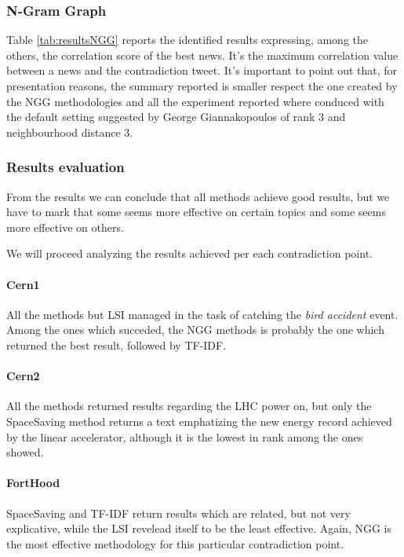 \subsubsection*{N-Gram Graph}
Table \ref{tab:resultsNGG} reports the identified results expressing, among the others, the correlation score of the best news. It's the maximum correlation value between a news and the contradiction tweet.
It's important to point out that, for presentation reasons, the summary reported is smaller respect the one created by the NGG methodologies and all the experiment reported where conduced with the default setting suggested by George Giannakopoulos of rank 3 and neighbourhood distance 3.









\subsubsection*{Results evaluation}
From the results we can conclude that all methods achieve good results,
but we have to mark that some seems more effective on certain topics and some
seems more effective on others.

We will proceed analyzing the results achieved per each contradiction point.

\paragraph*{Cern1}
All the methods but LSI managed in the task of catching the \emph{bird accident}
event. Among the ones which succeded, the NGG methods is probably the one which
returned the best result, followed by TF-IDF.

\paragraph*{Cern2}
All the methods returned results regarding the LHC power on, but only the
SpaceSaving method returns a text emphatizing the new energy record achieved by the
linear accelerator, although it is the lowest in rank among the ones showed.

\paragraph*{FortHood}
SpaceSaving and TF-IDF return results which are related, but not very
explicative, while the LSI revelead itself to be the least effective. Again, NGG
is the most effective methodology for this particular contradiction point.

